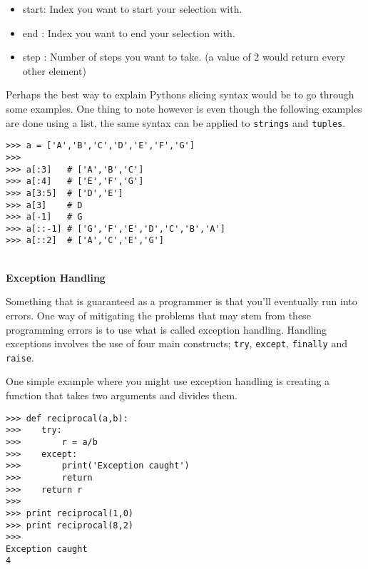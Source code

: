\documentclass[letterpaper,11pt]{article}
\begin{document}
\begin{itemize}
    \setlength\itemsep{1pt}
    \item start: Index you want to start your selection with.
    \item end  : Index you want to end your selection with.
    \item step : Number of steps you want to take. (a value of 2 would return
        every other element)
\end{itemize}
\par{Perhaps the best way to explain Pythons slicing syntax would be to go
through some examples. One thing to note however is even though the following
examples are done using a list, the same syntax can be applied to
\texttt{strings} and \texttt{tuples}.}
\\
\begin{minipage}{.75\textwidth}
    \begin{tcolorbox}
        \begin{footnotesize}
            \begin{verbatim}
>>> a = ['A','B','C','D','E','F','G']
>>>
>>> a[:3]   # ['A','B','C']
>>> a[:4]   # ['E','F','G']
>>> a[3:5]  # ['D','E']
>>> a[3]    # D
>>> a[-1]   # G
>>> a[::-1] # ['G','F','E','D','C','B','A']
>>> a[::2]  # ['A','C','E','G']
            \end{verbatim}
        \end{footnotesize}
    \end{tcolorbox}
\end{minipage}
\\
\textbf{Exception Handling}
\par{Something that is guaranteed as a programmer is that you'll eventually run
into errors. One way of mitigating the problems that may stem from these
programming errors is to use what is called exception handling. Handling
exceptions involves the use of four main constructs; \texttt{try},
\texttt{except}, \texttt{finally} and \texttt{raise}.} 
\par{One simple example where you might use exception handling is creating a
function that takes two arguments and divides them.}
\\
\begin{minipage}{.75\textwidth}
    \begin{tcolorbox}
        \begin{footnotesize}
            \begin{verbatim}
>>> def reciprocal(a,b):
>>>    try:
>>>        r = a/b
>>>    except:
>>>        print('Exception caught')
>>>        return
>>>    return r
>>>
>>> print reciprocal(1,0)
>>> print reciprocal(8,2)
>>>
Exception caught
4
            \end{verbatim}
        \end{footnotesize}
    \end{tcolorbox}
\end{minipage}
\end{document}
